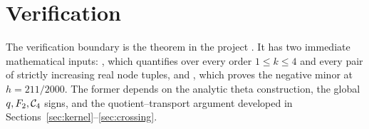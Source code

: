 \section{Verification}\label{sec:reproducibility}

The verification boundary is the theorem
 in the project
. It has two immediate mathematical inputs:
, which quantifies over every
order \(1\leq k\leq4\) and every pair of strictly increasing real node tuples,
and , which proves
the negative minor at \(h=211/2000\). The former depends on the analytic theta
construction, the global \(q,F_2,\mathcal{C}_4\) signs, and the quotient--transport
argument developed in Sections~\ref{sec:kernel}--\ref{sec:crossing}.

